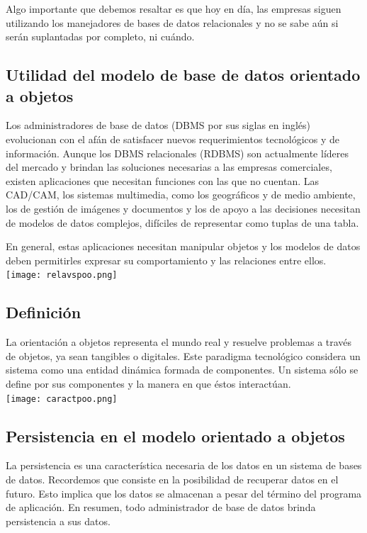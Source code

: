 \documentclass[12pts, A3 ,twosides]{article}
\begin{document}
Algo importante que debemos resaltar es que hoy en día, las empresas siguen utilizando los manejadores de bases de datos relacionales y no se sabe aún si serán suplantadas por completo, ni cuándo.

\subsection{Utilidad del modelo de base de datos orientado a objetos}
Los administradores de base de datos (DBMS por sus siglas en inglés) evolucionan con el afán de satisfacer nuevos requerimientos tecnológicos y de información. Aunque los DBMS relacionales (RDBMS) son actualmente líderes del mercado y brindan las soluciones necesarias a las empresas comerciales, existen aplicaciones que necesitan funciones con las que no cuentan. Las CAD/CAM, los sistemas multimedia, como los geográficos y de medio ambiente, los de gestión de imágenes y documentos y los de apoyo a las decisiones necesitan de modelos de datos complejos, difíciles de representar como tuplas de una tabla.

En general, estas aplicaciones necesitan manipular objetos y los modelos de datos deben permitirles expresar su comportamiento y las relaciones entre ellos. \\
\texttt{[image: relavspoo.png]}\\
\subsection{Definición}
La orientación a objetos representa el mundo real y resuelve problemas a través de objetos, ya sean tangibles o digitales. Este paradigma tecnológico considera un sistema como una entidad dinámica formada de componentes. Un sistema sólo se define por sus componentes y la manera en que éstos interactúan. \\
\texttt{[image: caractpoo.png]}\\

\subsection{Persistencia en el modelo orientado a objetos}
La persistencia es una característica necesaria de los datos en un sistema de bases de datos. Recordemos que consiste en la posibilidad de recuperar datos en el futuro. Esto implica que los datos se almacenan a pesar del término del programa de aplicación. En resumen, todo administrador de base de datos brinda persistencia a sus datos.\\
\end{document}
